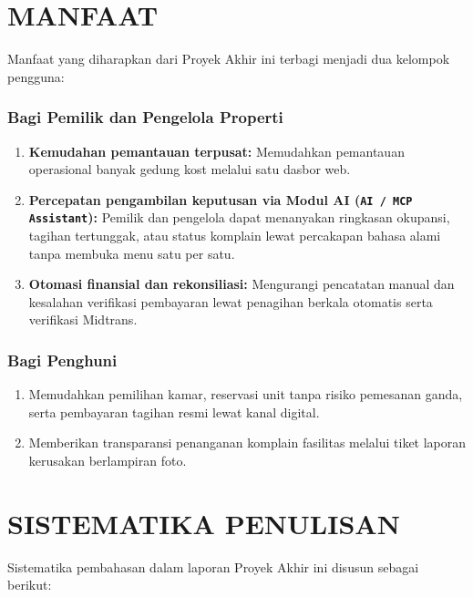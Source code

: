 \section{MANFAAT}

Manfaat yang diharapkan dari Proyek Akhir ini terbagi menjadi dua kelompok pengguna:

\subsubsection{Bagi Pemilik dan Pengelola Properti}
\begin{enumerate}[label=\arabic*., leftmargin=*]
  \item \textbf{Kemudahan pemantauan terpusat:} Memudahkan pemantauan operasional banyak gedung kost melalui satu dasbor web.
  \item \textbf{Percepatan pengambilan keputusan via Modul AI (\texttt{AI / MCP Assistant}):} Pemilik dan pengelola dapat menanyakan ringkasan okupansi, tagihan tertunggak, atau status komplain lewat percakapan bahasa alami tanpa membuka menu satu per satu.
  \item \textbf{Otomasi finansial dan rekonsiliasi:} Mengurangi pencatatan manual dan kesalahan verifikasi pembayaran lewat penagihan berkala otomatis serta verifikasi Midtrans.
\end{enumerate}

\subsubsection{Bagi Penghuni}
\begin{enumerate}[label=\arabic*., leftmargin=*]
  \item Memudahkan pemilihan kamar, reservasi unit tanpa risiko pemesanan ganda, serta pembayaran tagihan resmi lewat kanal digital.
  \item Memberikan transparansi penanganan komplain fasilitas melalui tiket laporan kerusakan berlampiran foto.
\end{enumerate}

\section{SISTEMATIKA PENULISAN}

Sistematika pembahasan dalam laporan Proyek Akhir ini disusun sebagai berikut:


